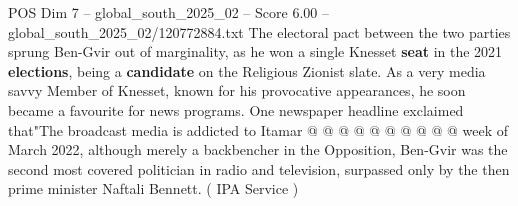 \begin{textsample}{POS Dim 7 – global\_south\_2025\_02 – Score 6.00 – global\_south\_2025\_02/120772884.txt}
The electoral pact between the two parties sprung Ben-Gvir out of marginality, as he won a single Knesset \textbf{seat} in the 2021 \textbf{elections}, being a \textbf{candidate} on the Religious Zionist slate.
As a very media savvy Member of Knesset, known for his provocative appearances, he soon became a favourite for news programs.
One newspaper headline exclaimed that"The broadcast media is addicted to Itamar @ @ @ @ @ @ @ @ @ @ week of March 2022, although merely a backbencher in the Opposition, Ben-Gvir was the second most covered politician in radio and television, surpassed only by the then prime minister Naftali Bennett. ( IPA Service )

\end{textsample}
